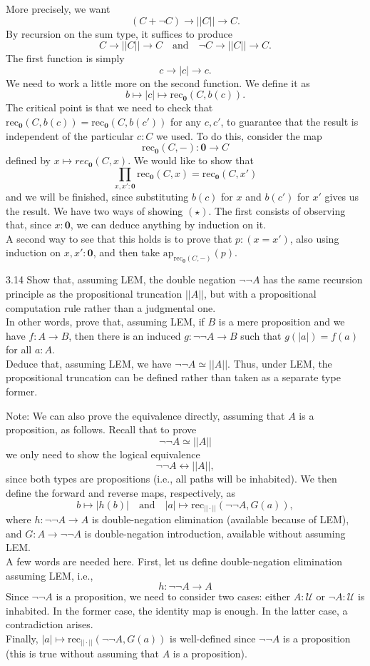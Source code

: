 \documentclass[14pt]{extarticle}
\newcommand{\0}{{\mathbf 0}}
\newcommand{\1}{{\mathbf 1}}
\newcommand{\2}{{\mathbf 2}}
\newcommand{\UU}{{\mathcal U}}
\newcommand{\mt}{\mapsto}
\newcommand{\rec}{\mathrm{rec}}
\newcommand{\ap}{\mathrm{ap}}
\newcommand{\quadt}[1]{\quad \text{#1} \quad}
\begin{document}
More precisely, we want
\[(C + \neg C) \to ||C|| \to C.\] By recursion on the sum type, it suffices to produce
\[C \to ||C|| \to C \quadt{and} \neg C \to ||C|| \to C.\] The first function is simply
\[c \to |c| \to c.\] We need to work a little more on the second function. We define it as
\[b \mt |c| \mt \rec_\0(C,b(c)).\] The critical point is that we need to check that
$\rec_\0(C,b(c)) = \rec_\0(C,b(c'))$ for any $c,c'$, to guarantee that the result is independent of the particular $c:C$ we used. To do this, consider the map
\[\rec_\0(C,-) : \0 \to C\] defined by $x \mt rec_\0(C,x)$. We would like to show that
\[\prod_{x,x':\0}\rec_\0(C,x) = \rec_\0(C,x') \tag{$\star$}\] and we will be finished, since substituting $b(c)$ for $x$ and $b(c')$ for $x'$ gives us the result. We have two ways of showing $(\star)$. The first consists of observing that, since $x:\0$, we can deduce anything by induction on it.\\
A second way to see that this holds is to prove that $p : (x = x')$, also using induction on $x,x':\0$, and then take $\ap_{\rec_\0(C,-)}(p)$.


\begin{prob}{3.14}{}
Show that, assuming LEM, the double negation $\neg \neg A$ has the same recursion principle as the propositional truncation $||A||$, but with a propositional computation rule rather than a judgmental one. \\
In other words, prove that, assuming LEM, if $B$ is a mere proposition and we have $f : A \to B$, then there is an induced $g : \neg \neg A \to B$ such that $g(|a|) = f(a)$ for all $a : A$. \\
Deduce that, assuming LEM, we have $\neg \neg A \simeq ||A||$. Thus, under LEM, the propositional truncation can be defined rather than taken as a separate type former.
\end{prob}
Note: We can also prove the equivalence directly, assuming that $A$ is a proposition, as follows. Recall that to prove
\[\neg \neg A \simeq ||A||\]
we only need to show the logical equivalence
\[\neg \neg A \leftrightarrow ||A||,\] since both types are propositions (i.e., all paths will be inhabited).
We then define the forward and reverse maps, respectively, as
\[b \mt |h(b)| \quadt{and} |a| \mt \rec_{||\cdot||}(\neg \neg A,G(a)),\] where $h : \neg \neg A \to A$ is double-negation elimination (available because of LEM), and $G : A \to \neg \neg A$ is double-negation introduction, available without assuming LEM.\\
A few words are needed here. First, let us define double-negation elimination assuming LEM, i.e.,
\[h : \neg \neg A \to A\]
Since $\neg \neg A$ is a proposition, we need to consider two cases: either $A:\UU$ or $\neg A : \UU$ is inhabited. In the former case, the identity map is enough. In the latter case, a contradiction arises.\\
Finally, $|a| \mt \rec_{||\cdot||}(\neg \neg A,G(a))$ is well-defined since $\neg \neg A$ is a proposition (this is true without assuming that $A$ is a proposition).
\end{document}
